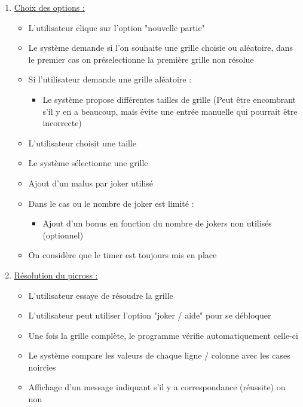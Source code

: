 \documentclass[a4paper, 12pt, twoside]{article}
\begin{document}
\begin{enumerate}\setlength{\itemsep}{5mm}
	\item{\ul{Choix des options :}}\newline
	\begin{itemize}\setlength{\itemsep}{3mm}
		\item L’utilisateur clique sur l'option "nouvelle partie"
		\item Le système demande si l'on souhaite une grille choisie ou aléatoire, dans le premier cas on préselectionne la première grille non résolue
		\item {Si l'utilisateur demande une grille al\'eatoire :}
		\begin{itemize}
			\item Le système propose différentes tailles de grille (Peut être encombrant s'il y en a beaucoup, mais évite une entrée manuelle qui pourrait être incorrecte)
		\end{itemize}	

		\item L'utilisateur choisit une taille
		\item Le système s\'electionne une grille
		\item Ajout d'un malus par joker utilis\'e
		\item {Dans le cas ou le nombre de joker est limit\'e :}
		\begin{itemize}\setlength{\itemsep}{3mm}
			\item Ajout d'un bonus en fonction du nombre de jokers non utilisés (optionnel)
		\end{itemize}	
		\item On considère que le timer est toujours mis en place
		\end{itemize}

	\item{\ul{R\'esolution du picross :}}\newline
	\begin{itemize}\setlength{\itemsep}{5mm}
		\item L'utilisateur essaye de résoudre la grille
		\item L'utilisateur peut utiliser l'option "joker / aide" pour se débloquer
		\item Une fois la grille complète, le programme vérifie automatiquement celle-ci
		\item Le système compare les valeurs de chaque ligne / colonne avec les cases noircies
		\item Affichage d'un message indiquant s'il y a correspondance (réussite) ou non


\end{itemize}
\end{enumerate}
\end{document}
